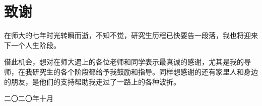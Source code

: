 
\chapter*{ 致\qquad 谢}


在师大的七年时光转瞬而逝，不知不觉，研究生历程已快要告一段落，我也将迎来下一个人生阶段。

借此机会，想对在师大遇上的各位老师和同学表示最真诚的感谢，尤其是我的导师，在我研究生的各个阶段都给予我鼓励和指导。同样想感谢的还有家里人和身边的朋友，是他们的支持帮助我走过了一路上的各种波折。


\vspace{0.2cm} \hspace{11.5cm}

\hspace{10.6cm}  二〇二〇年十月
